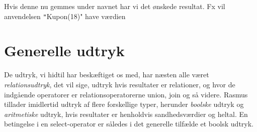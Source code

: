 \documentclass{article}
\newcounter{eks}
\begin{document}

Hvis denne nu gemmes under navnet  har vi det
\o{}nskede resultat. Fx vil anvendelsen \texttt"Kupon(18)" have
v\ae{}rdien
\begin{center}
\end{center}

\newpage
\section{Generelle udtryk}
De udtryk, vi hidtil har besk\ae{}ftiget os med, har n\ae{}sten alle
v\ae{}ret {\em relationsudtryk}, det vil sige, udtryk hvis resultater er
relationer, og hvor de indg\aa{}ende operatorer er relationsoperatorerne
union, join og s\aa{} videre. {\sc Rasmus} tillader imidlertid udtryk af
flere forskellige typer, herunder {\em boolske\/} udtryk og
{\em aritmetiske\/} udtryk, hvis resultater er henholdvis
sandhedsv\ae{}rdier og heltal. En betingelse i en select-operator er
s\aa{}ledes i det generelle tilf\ae{}lde et boolsk udtryk. 
\end{document}
